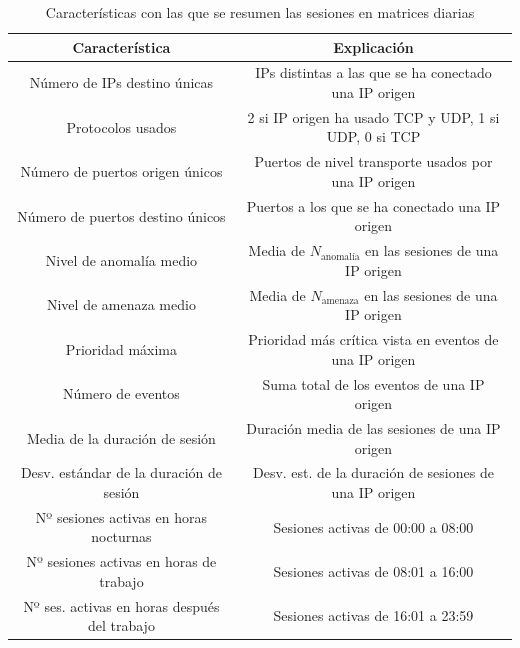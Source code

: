 \begin{table}[h]
    \centering
    \begingroup
    \setlength{\tabcolsep}{10pt} %
    \renewcommand{\arraystretch}{1.5} %
    \hspace*{-2cm}
    \begin{tabular}{|c|c|}
        \hline
        \textbf{Característica} & \textbf{Explicación} \\
        \hline
        \hline
        Número de IPs destino únicas  & IPs distintas a las que se ha conectado una IP origen \\
        \hline
        Protocolos usados & 2 si IP origen ha usado TCP y UDP, 1 si UDP, 0 si TCP \\
        \hline
        Número de puertos origen únicos & Puertos de nivel transporte usados por una IP origen \\
        \hline
        Número de puertos destino únicos & Puertos a los que se ha conectado una IP origen \\
        \hline
        Nivel de anomalía medio & Media de $N_{\textrm{anomalía}}$ en las sesiones de una IP origen \\
        \hline
        Nivel de amenaza medio & Media de $N_{\textrm{amenaza}}$ en las sesiones de una IP origen \\
        \hline
        Prioridad máxima & Prioridad más crítica vista en eventos de una IP origen \\
        \hline
        Número de eventos & Suma total de los eventos de una IP origen \\
        \hline
        Media de la duración de sesión & Duración media de las sesiones de una IP origen \\
        \hline
        Desv. estándar de la duración de sesión & Desv. est. de la duración de sesiones de una IP origen \\
        \hline
        Nº sesiones activas en horas nocturnas & Sesiones activas de 00:00 a 08:00 \\
        \hline
        Nº sesiones activas en horas de trabajo & Sesiones activas de 08:01 a 16:00 \\
        \hline
        Nº ses. activas en horas después del trabajo & Sesiones activas de 16:01 a 23:59 \\
        \hline
    \end{tabular}
    \hspace*{-1cm}
    \endgroup
    \caption{Características con las que se resumen las sesiones en matrices diarias}
    \label{tab:metricas}
\end{table}

